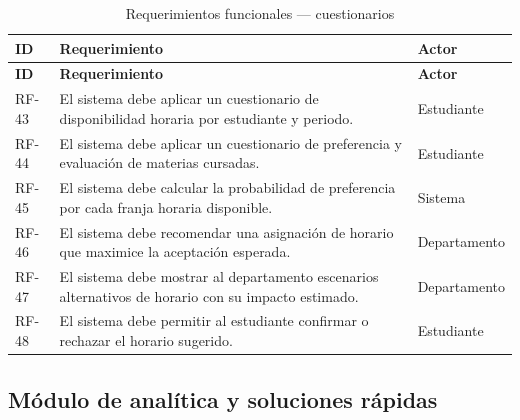 \begin{longtable}{@{}p{1.5cm} p{6.5cm} p{4.5cm}@{}}
\caption{Requerimientos funcionales --- cuestionarios}
\label{tab:rf-cuestionarios}\\
\toprule
\rowcolor{moradoClaro}
\textbf{ID} & \textbf{Requerimiento} & \textbf{Actor} \\
\midrule
\endfirsthead
\toprule
\rowcolor{moradoClaro}
\textbf{ID} & \textbf{Requerimiento} & \textbf{Actor} \\
\midrule
\endhead
RF-43 & El sistema debe aplicar un cuestionario de disponibilidad horaria por estudiante y periodo. & Estudiante \\
RF-44 & El sistema debe aplicar un cuestionario de preferencia y evaluación de materias cursadas. & Estudiante \\
RF-45 & El sistema debe calcular la probabilidad de preferencia por cada franja horaria disponible. & Sistema \\
RF-46 & El sistema debe recomendar una asignación de horario que maximice la aceptación esperada. & Departamento \\
RF-47 & El sistema debe mostrar al departamento escenarios alternativos de horario con su impacto estimado. & Departamento \\
RF-48 & El sistema debe permitir al estudiante confirmar o rechazar el horario sugerido. & Estudiante \\
\bottomrule
\end{longtable}

\subsection{Módulo de analítica y soluciones rápidas}

